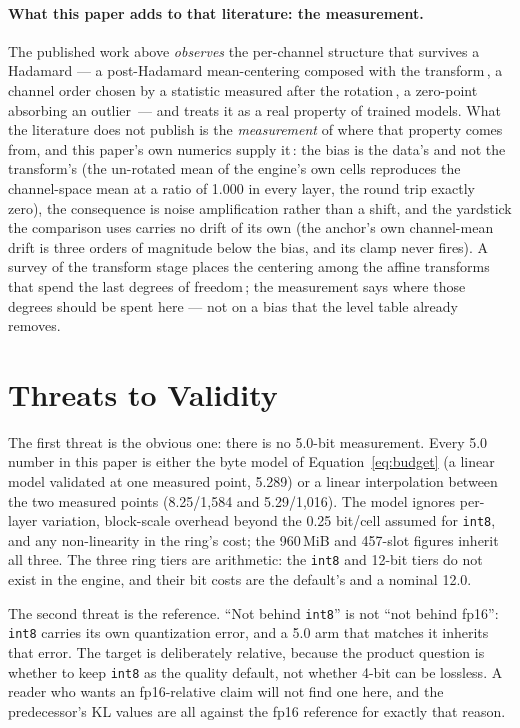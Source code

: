 \documentclass[10pt,twocolumn]{article}
\begin{document}
\paragraph{What this paper adds to that literature: the measurement.} The published work above \emph{observes} the per-channel structure that survives a Hadamard --- a post-Hadamard mean-centering composed with the transform\,\cite{hadanorm}, a channel order chosen by a statistic measured after the rotation\,\cite{rotatekv}, a zero-point absorbing an outlier\,\cite{offq} --- and treats it as a real property of trained models. What the literature does not publish is the \emph{measurement} of where that property comes from, and this paper's own numerics supply it\,\cite{strata-bias}: the bias is the data's and not the transform's (the un-rotated mean of the engine's own cells reproduces the channel-space mean at a ratio of 1.000 in every layer, the round trip exactly zero), the consequence is noise amplification rather than a shift, and the yardstick the comparison uses carries no drift of its own (the anchor's own channel-mean drift is three orders of magnitude below the bias, and its clamp never fires). A survey of the transform stage places the centering among the affine transforms that spend the last degrees of freedom\,\cite{great-inversion}; the measurement says where those degrees should be spent here --- not on a bias that the level table already removes.

\section{Threats to Validity}\label{sec:threats}

The first threat is the obvious one: there is no 5.0-bit measurement. Every 5.0 number in this paper is either the byte model of Equation~\ref{eq:budget} (a linear model validated at one measured point, 5.289) or a linear interpolation between the two measured points (8.25/1,584 and 5.29/1,016). The model ignores per-layer variation, block-scale overhead beyond the 0.25 bit/cell assumed for \texttt{int8}, and any non-linearity in the ring's cost; the 960\,MiB and 457-slot figures inherit all three. The three ring tiers are arithmetic: the \texttt{int8} and 12-bit tiers do not exist in the engine, and their bit costs are the default's and a nominal 12.0.

The second threat is the reference. ``Not behind \texttt{int8}'' is not ``not behind fp16'': \texttt{int8} carries its own quantization error, and a 5.0 arm that matches it inherits that error. The target is deliberately relative, because the product question is whether to keep \texttt{int8} as the quality default, not whether 4-bit can be lossless. A reader who wants an fp16-relative claim will not find one here, and the predecessor's KL values are all against the fp16 reference for exactly that reason.
\end{document}
